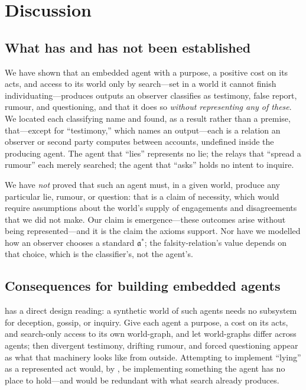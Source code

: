 \documentclass[11pt,twocolumn,a4paper]{article}
\newcommand{\acct}{\mathfrak{a}}   %
\begin{document}
\section{Discussion}
\label{sec:discussion}

\subsection{What has and has not been established}

We have shown that an embedded agent with a purpose, a positive cost on its
acts, and access to its world only by search---set in a world it cannot
finish individuating---produces outputs an observer classifies as testimony,
false report, rumour, and questioning, and that it does so \emph{without
representing any of these}. We located each classifying name and found, as a
result rather than a premise, that---except for ``testimony,'' which names an
output---each is a relation an observer or second party computes between
accounts, undefined inside the producing agent. The agent that ``lies''
represents no lie; the relays that ``spread a rumour'' each merely searched;
the agent that ``asks'' holds no intent to inquire.

We have \emph{not} proved that such an agent must, in a given world, produce
any particular lie, rumour, or question: that is a claim of necessity, which
would require assumptions about the world's supply of engagements and
disagreements that we did not make. Our claim is emergence---these outcomes
arise without being represented---and it is the claim the axioms support.
Nor have we modelled how an observer chooses a standard $\acct^\ast$; the
falsity-relation's value depends on that choice, which is the classifier's,
not the agent's.

\subsection{Consequences for building embedded agents}

 has a direct design reading: a synthetic world of such
agents needs no subsystem for deception, gossip, or inquiry. Give each agent
a purpose, a cost on its acts, and search-only access to its own world-graph,
and let world-graphs differ across agents; then divergent testimony, drifting
rumour, and forced questioning appear as what that machinery looks like from
outside. Attempting to implement ``lying'' as a represented act would, by
, be implementing something the agent has no place
to hold---and would be redundant with what search already produces.
\end{document}
